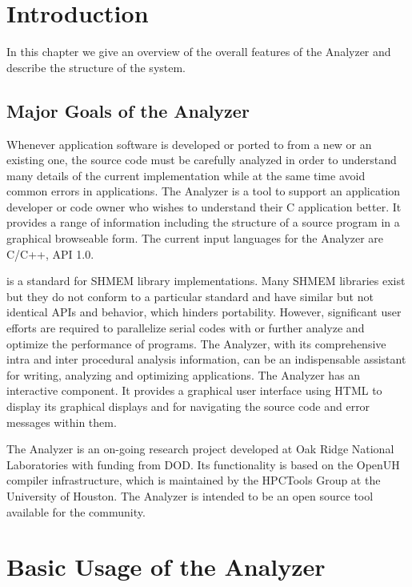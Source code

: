 \section{Introduction}
\label{chapter:introduction}

In this chapter we give an overview of the overall features of the
\openshmem Analyzer and describe the structure of the system.

\subsection{Major Goals of the \openshmem Analyzer}

Whenever application software is developed or ported to \openshmem
from a new or an existing one, the source code must be carefully
analyzed in order to understand many details of the current
implementation while at the same time avoid common errors in
\openshmem applications. The \openshmem Analyzer is a tool to support
an application developer or code owner who wishes to understand their
C application better. It provides a range of information including the
structure of a source program in a graphical browseable form. The
current input languages for the \openshmem Analyzer are C/C++,
\openshmem API 1.0.

\openshmem is a standard for SHMEM library implementations. Many SHMEM
libraries exist but they do not conform to a particular standard and
have similar but not identical APIs and behavior, which hinders
portability. However, significant user efforts are required to
parallelize serial codes with \openshmem or further analyze and
optimize the performance of \openshmem programs. The \openshmem
Analyzer, with its comprehensive intra and inter procedural analysis
information, can be an indispensable assistant for writing, analyzing
and optimizing \openshmem applications.  The \openshmem Analyzer has an
interactive component. It provides a graphical user interface using
HTML to display its graphical displays and for navigating the source
code and error messages within them.

The \openshmem Analyzer is an on-going research project developed at
Oak Ridge National Laboratories with funding from DOD. Its
functionality is based on the OpenUH compiler infrastructure, which is
maintained by the HPCTools Group at the University of
Houston. The \openshmem Analyzer is intended to be an open source tool
available for the \openshmem community.

\section{Basic Usage of the \openshmem Analyzer}
\label{chapter:basic-usage}

